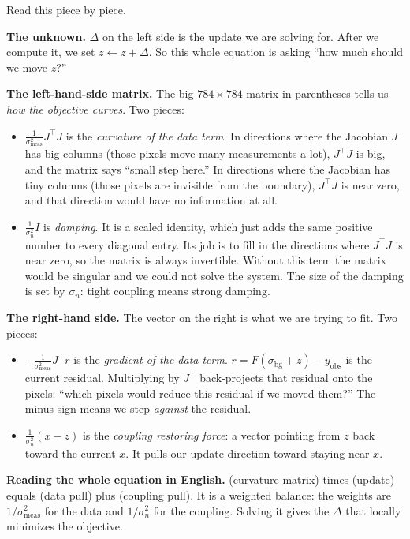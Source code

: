 \documentclass[11pt]{article}
\begin{document}
Read this piece by piece.

\textbf{The unknown.} $\Delta$ on the left side is the update we are
solving for. After we compute it, we set $z \leftarrow z + \Delta$.
So this whole equation is asking ``how much should we move $z$?''

\textbf{The left-hand-side matrix.} The big $784 \times 784$ matrix in
parentheses tells us \emph{how the objective curves}. Two pieces:

\begin{itemize}[leftmargin=2em]
\item $\frac{1}{\sigma_{\text{meas}}^2} J^\top J$ is the
  \emph{curvature of the data term}. In directions where the Jacobian
  $J$ has big columns (those pixels move many measurements a lot),
  $J^\top J$ is big, and the matrix says ``small step here.'' In
  directions where the Jacobian has tiny columns (those pixels are
  invisible from the boundary), $J^\top J$ is near zero, and that
  direction would have no information at all.
\item $\frac{1}{\sigma_n^2} I$ is \emph{damping}. It is a scaled
  identity, which just adds the same positive number to every diagonal
  entry. Its job is to fill in the directions where $J^\top J$ is near
  zero, so the matrix is always invertible. Without this term the
  matrix would be singular and we could not solve the system. The size
  of the damping is set by $\sigma_n$: tight coupling means strong
  damping.
\end{itemize}

\textbf{The right-hand side.} The vector on the right is what we are
trying to fit. Two pieces:

\begin{itemize}[leftmargin=2em]
\item $-\frac{1}{\sigma_{\text{meas}}^2} J^\top r$ is the
  \emph{gradient of the data term}. $r = F(\sigma_{\text{bg}} + z) -
  y_{\text{obs}}$ is the current residual. Multiplying by $J^\top$
  back-projects that residual onto the pixels: ``which pixels would
  reduce this residual if we moved them?'' The minus sign means we
  step \emph{against} the residual.
\item $\frac{1}{\sigma_n^2} (x - z)$ is the \emph{coupling restoring
  force}: a vector pointing from $z$ back toward the current $x$. It
  pulls our update direction toward staying near $x$.
\end{itemize}

\textbf{Reading the whole equation in English.} (curvature matrix)
times (update) equals (data pull) plus (coupling pull). It is a
weighted balance: the weights are $1/\sigma_{\text{meas}}^2$ for the
data and $1/\sigma_n^2$ for the coupling. Solving it gives the
$\Delta$ that locally minimizes the objective.
\end{document}

